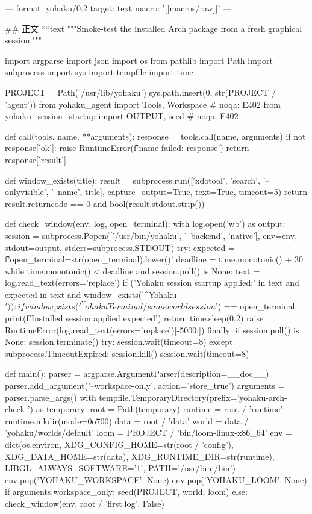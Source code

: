 ---
format: yohaku/0.2
target: text
macro: '[[macros/raw]]'
---

## 正文
````text
"""Smoke-test the installed Arch package from a fresh graphical session."""

import argparse
import json
import os
from pathlib import Path
import subprocess
import sys
import tempfile
import time


PROJECT = Path('/usr/lib/yohaku')
sys.path.insert(0, str(PROJECT / 'agent'))
from yohaku_agent import Tools, Workspace  # noqa: E402
from yohaku_session_startup import OUTPUT, seed  # noqa: E402


def call(tools, name, **arguments):
    response = tools.call(name, arguments)
    if not response['ok']:
        raise RuntimeError(f'{name} failed: {response}')
    return response['result']


def window_exists(title):
    result = subprocess.run(['xdotool', 'search', '--onlyvisible', '--name', title],
                            capture_output=True, text=True, timeout=5)
    return result.returncode == 0 and bool(result.stdout.strip())


def check_window(env, log, open_terminal):
    with log.open('wb') as output:
        session = subprocess.Popen(['/usr/bin/yohaku', '--backend', 'native'],
                                   env=env, stdout=output, stderr=subprocess.STDOUT)
        try:
            expected = f'open_terminal={str(open_terminal).lower()}'
            deadline = time.monotonic() + 30
            while time.monotonic() < deadline and session.poll() is None:
                text = log.read_text(errors='replace')
                if ('Yohaku session startup applied:' in text and expected in text
                        and window_exists('^Yohaku$')):
                    if window_exists('^Yohaku Terminal / same world session$') == open_terminal:
                        print(f'Installed session applied {expected}')
                        return
                time.sleep(0.2)
            raise RuntimeError(log.read_text(errors='replace')[-5000:])
        finally:
            if session.poll() is None:
                session.terminate()
                try:
                    session.wait(timeout=8)
                except subprocess.TimeoutExpired:
                    session.kill()
                    session.wait(timeout=8)


def main():
    parser = argparse.ArgumentParser(description=__doc__)
    parser.add_argument('--workspace-only', action='store_true')
    arguments = parser.parse_args()
    with tempfile.TemporaryDirectory(prefix='yohaku-arch-check-') as temporary:
        root = Path(temporary)
        runtime = root / 'runtime'
        runtime.mkdir(mode=0o700)
        data = root / 'data'
        world = data / 'yohaku/worlds/default'
        loom = PROJECT / 'bin/loom-linux-x86_64'
        env = dict(os.environ, XDG_CONFIG_HOME=str(root / 'config'),
                   XDG_DATA_HOME=str(data), XDG_RUNTIME_DIR=str(runtime),
                   LIBGL_ALWAYS_SOFTWARE='1', PATH='/usr/bin:/bin')
        env.pop('YOHAKU_WORKSPACE', None)
        env.pop('YOHAKU_LOOM', None)
        if arguments.workspace_only:
            seed(PROJECT, world, loom)
        else:
            check_window(env, root / 'first.log', False)

